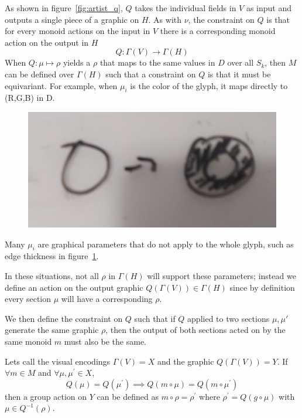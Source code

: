 \documentclass[../main.tex]{subfiles}
\begin{document}
As shown in figure~\ref{fig:artist_q}, $Q$ takes the individual fields in $V$ as input and outputs a single piece of a graphic on $H$. As with $\nu$, the constraint on $Q$ is that for every monoid actions on the input in $V$ there is a corresponding monoid action on the output in $H$
\begin{equation}
    Q: \Gamma(V) \rightarrow \Gamma(H)
\end{equation}
When $Q: \mu \mapsto \rho$ yields a $\rho$ that maps to the same values in $D$ over all $S_k$, then $M$ can be defined over $\Gamma(H)$ such that a constraint on $Q$ is that it must be equivariant. For example, when $\mu_{i}$ is the color of the glyph, it maps directly to (R,G,B) in D.

\begin{figure}[h!]
    \includegraphics[width=\textwidth]{figures/math/diff_type_q.png}
    \label{fig:artist_mark_change}
\end{figure}

Many $\mu_{i}$ are graphical parameters that do not apply to the whole glyph, such as edge thickness in figure~\ref{fig:artist_mark_change}. 

In these situations, not all  $\rho$ in $\Gamma(H)$ will support these parameters; instead we define an action on the output graphic $Q(\Gamma(V)) \in \Gamma(H)$ since by definition every section $\mu$ will have a corresponding $\rho$.

We then define the constraint on $Q$ such that if $Q$ applied to two sections $\mu, \mu\prime$ generate the same graphic $\rho$, then the output of both sections acted on by the same monoid $m$ must also be the same.    

Lets call the visual encodings $\Gamma(V)=X$ and the graphic $Q(\Gamma(V))=Y$. If $\forall m \in M$ and $\forall \mu, \mu^\prime \in X$, 
\begin{equation}
Q(\mu) = Q(\mu^\prime)\implies Q(m\circ\mu) = Q(m\circ\mu^\prime)
\end{equation}
then a group action on $Y$ can be defined as $m\circ \rho = \rho^\prime$ where $\rho^\prime=Q(g\circ \mu)$ with $\mu \in Q^{-1}(\rho)$. 
\end{document}
